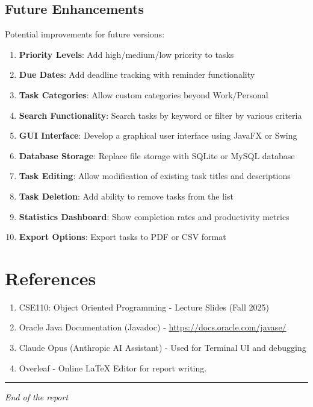 \documentclass[12pt,a4paper]{article}
\begin{document}
\subsection{Future Enhancements}

Potential improvements for future versions:

\begin{enumerate}
    \item \textbf{Priority Levels}: Add high/medium/low priority to tasks
    \item \textbf{Due Dates}: Add deadline tracking with reminder functionality
    \item \textbf{Task Categories}: Allow custom categories beyond Work/Personal
    \item \textbf{Search Functionality}: Search tasks by keyword or filter by various criteria
    \item \textbf{GUI Interface}: Develop a graphical user interface using JavaFX or Swing
    \item \textbf{Database Storage}: Replace file storage with SQLite or MySQL database
    \item \textbf{Task Editing}: Allow modification of existing task titles and descriptions
    \item \textbf{Task Deletion}: Add ability to remove tasks from the list
    \item \textbf{Statistics Dashboard}: Show completion rates and productivity metrics
    \item \textbf{Export Options}: Export tasks to PDF or CSV format
\end{enumerate}

\section{References}

\begin{enumerate}
    \item CSE110: Object Oriented Programming - Lecture Slides (Fall 2025)
    \item Oracle Java Documentation (Javadoc) - \url{https://docs.oracle.com/javase/}
    \item Claude Opus (Anthropic AI Assistant) - Used for Terminal UI and debugging
    \item Overleaf - Online LaTeX Editor for report writing.
\end{enumerate}

\vspace{1cm}
\hrule
\vspace{0.5cm}
\centering
\textit{End of the report}
\end{document}

